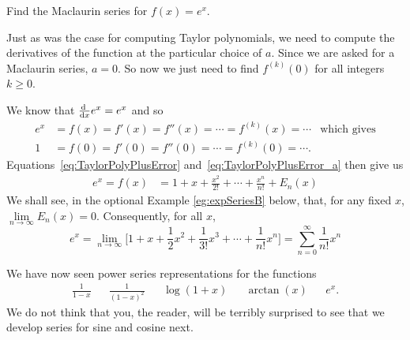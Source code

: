 \begin{eg}\label{eg:expSeries}
Find the Maclaurin series for $f(x)=e^x$.

\soln Just as was the case for computing Taylor polynomials, we need
to compute the derivatives of the function at the
particular choice of $a$. Since we are asked for a Maclaurin series,
$a=0$. So now we just need to find
$f^{(k)}(0)$ for all integers $k\ge 0$.

We know that $\diff{}{x}e^x = e^x$ and so
\begin{align*}
  e^x &= f(x) = f'(x) = f''(x) = \cdots = f^{(k)}(x) = \cdots & \text{which gives}\\
  1 &= f(0) = f'(0) = f''(0) = \cdots = f^{(k)}(0) = \cdots.
\end{align*}
Equations~\eqref{eq:TaylorPolyPlusError} and~\eqref{eq:TaylorPolyPlusError_a} then give us
\begin{align*}
e^x=f(x)&=
1+x+\frac{x^2}{2!}+\cdots+\frac{x^n}{n!}+E_n(x)
\end{align*}
We shall see, in the optional Example \ref{eg:expSeriesB} below, that,
for any fixed $x$, $\lim\limits_{n\rightarrow\infty}E_n(x)=0$.
Consequently, for all $x$,
\begin{equation*}%
e^x=\lim_{n\rightarrow\infty}\Big[1 +x + \frac{1}{2} x^2
     +\frac{1}{3!} x^3+\cdots+\frac{1}{n!} x^n\Big]
    =\sum_{n=0}^\infty \frac{1}{n!}x^n
\end{equation*}
\end{eg}


We have now seen power series representations for the functions
\begin{align*}
  \frac{1}{1-x} && \frac{1}{(1-x)^2} && \log(1+x) && \arctan(x) && e^x.
\end{align*}
We do not think that you, the reader, will be terribly surprised to see
that we develop series for sine and cosine next.

